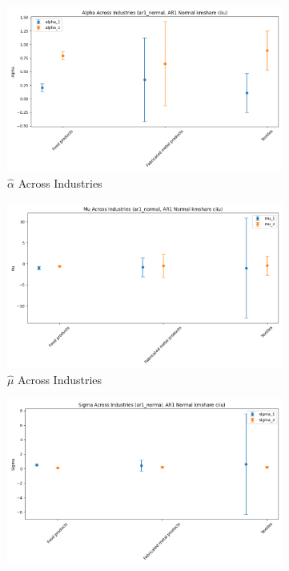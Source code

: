 \documentclass{article}
\begin{document}
\begin{figure}[ht!]
    \centering 
    \caption{AR(1) Normal Model with $\log K$, Import and CIIU Across Industries}
    \begin{subfigure}[t]{0.32\textwidth}
        \centering
        \includegraphics[width=\textwidth]{figure/ar1_normal_kmshare_ciiu_alpha_across_industries.png}
        \caption{$\hat\alpha$ Across Industries}
    \end{subfigure}
    \begin{subfigure}[t]{0.32\textwidth}
        \centering
        \includegraphics[width=\textwidth]{figure/ar1_normal_kmshare_ciiu_mu_across_industries.png}
        \caption{$\hat\mu$ Across Industries}
    \end{subfigure}
    \begin{subfigure}[t]{0.32\textwidth}
        \centering
        \includegraphics[width=\textwidth]{figure/ar1_normal_kmshare_ciiu_sigma_across_industries.png}

\end{subfigure}
\end{figure}
\end{document}
